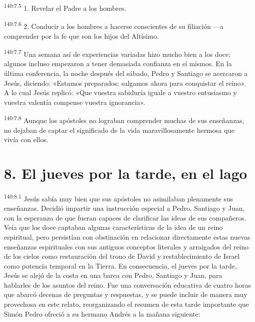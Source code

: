 \par
\textsuperscript{140:7.5} 1. Revelar el Padre a los hombres.

\par
\textsuperscript{140:7.6} 2. Conducir a los hombres a hacerse conscientes de su filiación ---a comprender por la fe que son los hijos del Altísimo.

\par
\textsuperscript{140:7.7} Una semana así de experiencias variadas hizo mucho bien a los doce; algunos incluso empezaron a tener demasiada confianza en sí mismos. En la última conferencia, la noche después del sábado, Pedro y Santiago se acercaron a Jesús, diciendo: «Estamos preparados; salgamos ahora para conquistar el reino». A lo cual Jesús replicó: «Que vuestra sabiduría iguale a vuestro entusiasmo y vuestra valentía compense vuestra ignorancia».

\par
\textsuperscript{140:7.8} Aunque los apóstoles no lograban comprender muchas de sus enseñanzas, no dejaban de captar el significado de la vida maravillosamente hermosa que vivía con ellos.

\section*{8. El jueves por la tarde, en el lago}
\par
\textsuperscript{140:8.1} Jesús sabía muy bien que sus apóstoles no asimilaban plenamente sus enseñanzas. Decidió impartir una instrucción especial a Pedro, Santiago y Juan, con la esperanza de que fueran capaces de clarificar las ideas de sus compañeros. Veía que los doce captaban algunas características de la idea de un reino espiritual, pero persistían con obstinación en relacionar directamente estas nuevas enseñanzas espirituales con sus antiguos conceptos literales y arraigados del reino de los cielos como restauración del trono de David y restablecimiento de Israel como potencia temporal en la Tierra. En consecuencia, el jueves por la tarde, Jesús se alejó de la costa en una barca con Pedro, Santiago y Juan, para hablarles de los asuntos del reino. Fue una conversación educativa de cuatro horas que abarcó decenas de preguntas y respuestas, y se puede incluir de manera muy provechosa en este relato, reorganizando el resumen de esta tarde importante que Simón Pedro ofreció a su hermano Andrés a la mañana siguiente:

